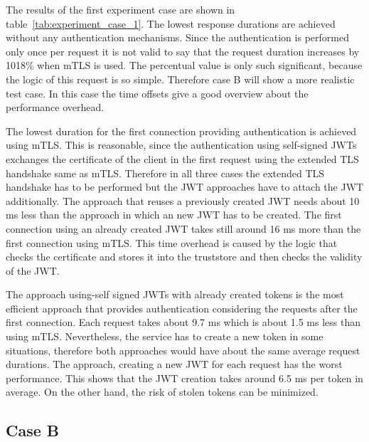 The results of the first experiment case are shown in table~\ref{tab:experiment_case_1}.
The lowest response durations are achieved without any authentication mechanisms.
Since the authentication is performed only once per request it is not valid to say that the request duration increases by 1018\% when mTLS is used.
The percentual value is only such significant, because the logic of this request is so simple.
Therefore case B will show a more realistic test case.
In this case the time offsets give a good overview about the performance overhead.

The lowest duration for the first connection providing authentication is achieved using mTLS.
This is reasonable, since the authentication using self-signed JWTs exchanges the certificate of the client in the first request using the extended TLS handshake same as mTLS.
Therefore in all three cases the extended TLS handshake has to be performed but the JWT approaches have to attach the JWT additionally.
The approach that reuses a previously created JWT needs about 10 ms less than the approach in which an new JWT has to be created.
The first connection using an already created JWT takes still around 16 ms more than the first connection using mTLS.
This time overhead is caused by the logic that checks the certificate and stores it into the truststore and then checks the validity of the JWT.

The approach using-self signed JWTs with already created tokens is the most efficient approach that provides authentication considering the requests after the first connection.
Each request takes about 9.7 ms which is about 1.5 ms less than using mTLS.
Nevertheless, the service has to create a new token in some situations, therefore both approaches would have about the same average request durations.
The approach, creating a new JWT for each request has the worst performance.
This shows that the JWT creation takes around 6.5 ms per token in average.
On the other hand, the risk of stolen tokens can be minimized.

\subsection{Case B}
